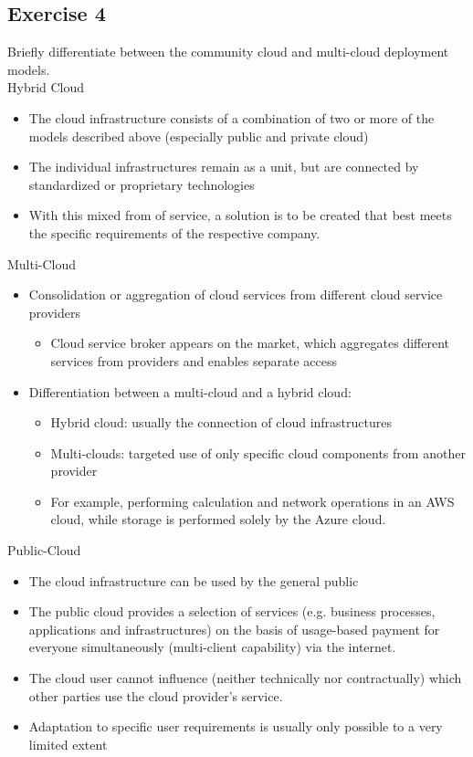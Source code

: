 \documentclass{article}
\begin{document}
\subsection{Exercise 4}
Briefly differentiate between the community cloud and multi-cloud deployment models.\\
Hybrid Cloud
\begin{itemize}
    \item The cloud infrastructure consists of a combination of two or more of the models described above (especially public and private cloud)
    \item The individual infrastructures remain as a unit, but are connected by standardized or proprietary technologies
    \item With this mixed from of service, a solution is to be created that best meets the specific requirements of the respective company.
\end{itemize}
Multi-Cloud
\begin{itemize}
    \item Consolidation or aggregation of cloud services from different cloud service providers
          \begin{itemize}
              \item Cloud service broker appears on the market, which aggregates different services from providers and enables separate access
          \end{itemize}
    \item Differentiation between a multi-cloud and a hybrid cloud:
          \begin{itemize}
              \item Hybrid cloud: usually the connection of cloud infrastructures
              \item Multi-clouds: targeted use of only specific cloud components from another provider
              \item For example, performing calculation and network operations in an AWS cloud, while storage is performed solely by the Azure cloud.
          \end{itemize}
\end{itemize}
Public-Cloud
\begin{itemize}
    \item The cloud infrastructure can be used by the general public
    \item The public cloud provides a selection of services (e.g. business processes, applications and infrastructures) on the basis of usage-based payment for everyone simultaneously (multi-client capability) via the internet.
    \item The cloud user cannot influence (neither technically nor contractually) which other parties use the cloud provider's service.
    \item Adaptation to specific user requirements is usually only possible to a very limited extent
\end{itemize}
\end{document}
